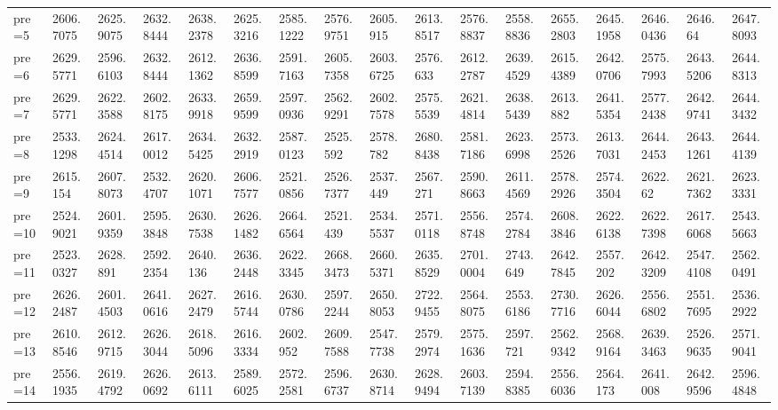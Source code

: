 \documentclass[11pt]{article}
\begin{document}
\begin{tabular}{lllllllllllllllll}
	 pre=5       & 2606.7075   & 2625.9075   & 2632.8444   & 2638.2378   & 2625.3216   & 2585.1222   & 2576.9751   & 2605.915    & 2613.8517   & 2576.8837   & 2558.8836   & 2655.2803   & 2645.1958   & 2646.0436   & 2646.64     & 2647.8093  \\
	 pre=6       & 2629.5771   & 2596.6103   & 2632.8444   & 2612.1362   & 2636.8599   & 2591.7163   & 2605.7358   & 2603.6725   & 2576.633    & 2612.2787   & 2639.4529   & 2615.4389   & 2642.0706   & 2575.7993   & 2643.5206   & 2644.8313  \\
	 pre=7       & 2629.5771   & 2622.3588   & 2602.8175   & 2633.9918   & 2659.9599   & 2597.0936   & 2562.9291   & 2602.7578   & 2575.5539   & 2621.4814   & 2638.5439   & 2613.882    & 2641.5354   & 2577.2438   & 2642.9741   & 2644.3432  \\
	 pre=8       & 2533.1298   & 2624.4514   & 2617.0012   & 2634.5425   & 2632.2919   & 2587.0123   & 2525.592    & 2578.782    & 2680.8438   & 2581.7186   & 2623.6998   & 2573.2526   & 2613.7031   & 2644.2453   & 2643.1261   & 2644.4139  \\
	 pre=9       & 2615.154    & 2607.8073   & 2532.4707   & 2620.1071   & 2606.7577   & 2521.0856   & 2526.7377   & 2537.449    & 2567.271    & 2590.8663   & 2611.4569   & 2578.2926   & 2574.3504   & 2622.62     & 2621.7362   & 2623.3331  \\
	 pre=10      & 2524.9021   & 2601.9359   & 2595.3848   & 2630.7538   & 2626.1482   & 2664.6564   & 2521.439    & 2534.5537   & 2571.0118   & 2556.8748   & 2574.2784   & 2608.3846   & 2622.6138   & 2622.7398   & 2617.6068   & 2543.5663  \\
	 pre=11      & 2523.0327   & 2628.891    & 2592.2354   & 2640.136    & 2636.2448   & 2622.3345   & 2668.3473   & 2660.5371   & 2635.8529   & 2701.0004   & 2743.649    & 2642.7845   & 2557.202    & 2642.3209   & 2547.4108   & 2562.0491  \\
	 pre=12      & 2626.2487   & 2601.4503   & 2641.0616   & 2627.2479   & 2616.5744   & 2630.0786   & 2597.2244   & 2650.8053   & 2722.9455   & 2564.8075   & 2553.6186   & 2730.7716   & 2626.6044   & 2556.6802   & 2551.7695   & 2536.2922  \\
	 pre=13      & 2610.8546   & 2612.9715   & 2626.3044   & 2618.5096   & 2616.3334   & 2602.952    & 2609.7588   & 2547.7738   & 2579.2974   & 2575.1636   & 2597.721    & 2562.9342   & 2568.9164   & 2639.3463   & 2526.9635   & 2571.9041  \\
	 pre=14      & 2556.1935   & 2619.4792   & 2626.0692   & 2613.6111   & 2589.6025   & 2572.2581   & 2596.6737   & 2630.8714   & 2628.9494   & 2603.7139   & 2594.8385   & 2556.6036   & 2564.173    & 2641.008    & 2642.9596   & 2596.4848  \\

\end{tabular}
\end{document}
